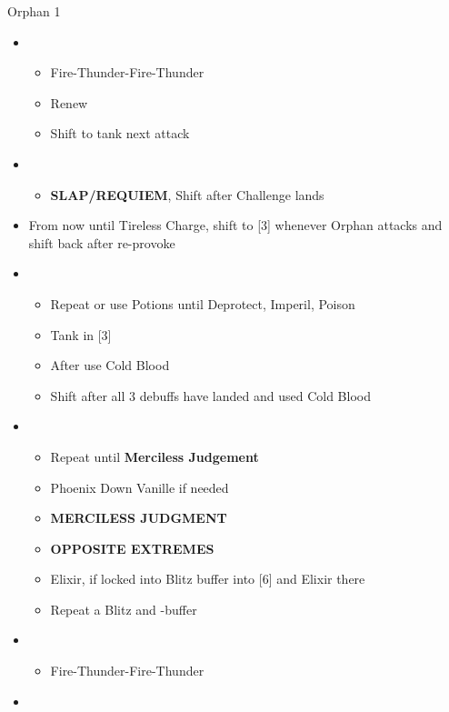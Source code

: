 \begin{battle}{Orphan 1}
\begin{multicols}{2}
\begin{itemize}
      \item \fifth
            \begin{itemize}
              \item Fire-Thunder-Fire-Thunder
              \item Renew
              \item Shift to tank next attack
            \end{itemize}
      \item \third
            \begin{itemize}
              \item \textbf{SLAP/REQUIEM}, Shift after Challenge lands
            \end{itemize}
            \vfill\null
            \columnbreak
      \item From now until Tireless Charge, shift to [3] whenever Orphan attacks and shift back after re-provoke
      \item \fifth
            \begin{itemize}
              \item Repeat or use Potions until Deprotect, Imperil, Poison
              \item Tank in [3]
              \item After \stagger use Cold Blood
              \item Shift after all 3 debuffs have landed and used Cold Blood
            \end{itemize}
      \item \first
            \begin{itemize}
              \item Repeat until \textbf{Merciless Judgement}
              \item Phoenix Down Vanille if needed
              \item \textbf{MERCILESS JUDGMENT}
              \item \textbf{OPPOSITE EXTREMES}
              \item Elixir, if locked into Blitz buffer into [6] and Elixir there
              \item Repeat a Blitz and \rav-buffer
            \end{itemize}
      \item \sixth
            \begin{itemize}
              \item Fire-Thunder-Fire-Thunder
            \end{itemize}
      \item \fourth

\end{itemize}
\end{multicols}
\end{battle}
